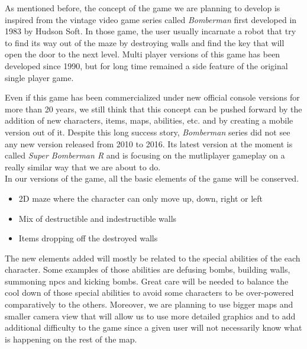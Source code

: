 
As mentioned before, the concept of the game we are planning to develop is inspired from the vintage video game series called \textit{Bomberman} first developed in 1983 by Hudson Soft. In those game, the user usually incarnate a robot that try to find its way out of the maze by destroying walls and find the key that will open the door to the next level. Multi player versions of this game has been developed since 1990, but for long time remained a side feature of the original single player game. \cite{wiki:bomberman} \\


Even if this game has been commercialized under new official console versions for more than 20 years, we still think that this concept can be pushed forward by the addition of new characters, items, maps, abilities, etc. and by creating a mobile version out of it. Despite this long success story, \textit{Bomberman} series did not see any new version released from 2010 to 2016. Its latest version at the moment is called \textit{Super Bomberman R} and is focusing on the mutliplayer gameplay on a really similar way that we are about to do. \\

In our versions of the game, all the basic elements of the game will be conserved.
\begin{itemize}
  \item 2D maze where the character can only move up, down, right or left
  \item Mix of destructible and indestructible walls
  \item Items dropping off the destroyed walls
\end{itemize}
The new elements added will mostly be related to the special abilities of the each character. Some examples of those abilities are defusing bombs, building walls, summoning \glspl{npc} and kicking bombs. Great care will be needed to balance the cool down of those special abilities to avoid some characters to be over-powered comparatively to the others. Moreover, we are planning to use bigger maps and smaller camera view that will allow us to use more detailed graphics and to add additional difficulty to the game since a given user will not necessarily know what is happening on the rest of the map. \\

